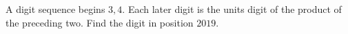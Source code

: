 A digit sequence begins $3,4$. Each later digit is the units digit of the product of the preceding two. Find the digit in position $2019$.
